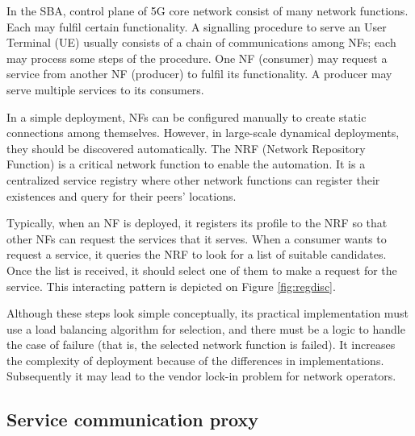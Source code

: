 \documentclass[conference]{IEEEtran}
\begin{document}
In the SBA, control plane of 5G core network consist of many network functions.
Each may fulfil certain functionality. A signalling procedure to serve an User
Terminal (UE) usually consists of a chain of communications among NFs; each may
process some steps of the procedure. One NF (consumer) may request a service from
another NF (producer) to fulfil its functionality. A producer may serve
multiple services to its consumers.

In a simple deployment, NFs can be configured manually to create static
connections among themselves. However, in large-scale dynamical deployments, they
should be discovered automatically. The NRF (Network Repository Function) is a
critical network function to enable the automation.  It is a centralized
service registry where other network functions can register their existences
and query for their peers' locations. 

Typically, when an NF is deployed, it registers its profile to the NRF so that
other NFs can request the services that it serves.  When a consumer wants to
request a service, it queries the NRF to look for a list of suitable
candidates. Once the list is received, it should select one of them to make a
request for the service. This interacting pattern is depicted on Figure
\ref{fig:regdisc}.

Although these steps look simple conceptually, its practical implementation
must use a load balancing algorithm for selection, and there must be a logic to
handle the case of failure (that is, the selected network function is failed).
It increases the complexity of deployment because of the differences in
implementations.  Subsequently it may lead to the vendor lock-in problem for
network operators.

\subsection{Service communication proxy}
\end{document}
